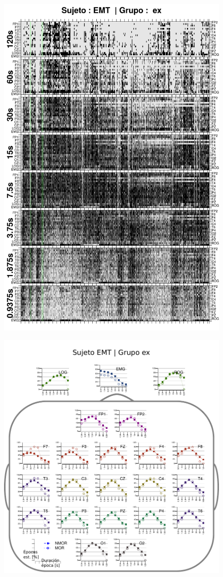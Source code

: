 \begin{figure}
\centering
\includegraphics[width=0.9\linewidth]
{./img_ejemplos/EMNNS_comp_est_.png} 
\end{figure}

\begin{figure}
\centering
\includegraphics[width=.9\linewidth]{./img_resultados/cabeza_EMT.pdf}
\end{figure}

